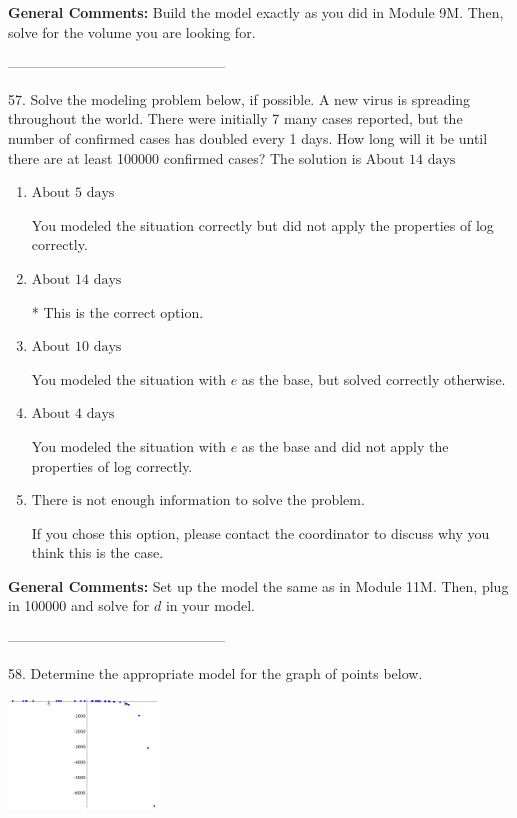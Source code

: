 \documentclass{extbook}[14pt]
\begin{document}
\textbf{General Comments:} Build the model exactly as you did in Module 9M. Then, solve for the volume you are looking for.

-----------------------------------------------

57. Solve the modeling problem below, if possible.
A new virus is spreading throughout the world. There were initially 7 many cases reported, but the number of confirmed cases has doubled every 1 days. How long will it be until there are at least 100000 confirmed cases? 
The solution is $ \text{About } 14 \text{ days} $ 

\begin{enumerate}[label=\Alph*.] 
\item $ \text{About } 5 \text{ days} $ 

 You modeled the situation correctly but did not apply the properties of log correctly. 
\item $ \text{About } 14 \text{ days} $ 

 * This is the correct option. 
\item $ \text{About } 10 \text{ days} $ 

 You modeled the situation with $e$ as the base, but solved correctly otherwise. 
\item $ \text{About } 4 \text{ days} $ 

 You modeled the situation with $e$ as the base and did not apply the properties of log correctly. 
\item $ \text{There is not enough information to solve the problem.} $ 

 If you chose this option, please contact the coordinator to discuss why you think this is the case. 
\end{enumerate} 
 
\textbf{General Comments:} Set up the model the same as in Module 11M. Then, plug in 100000 and solve for $d$ in your model.

-----------------------------------------------

58. Determine the appropriate model for the graph of points below.
\begin{center} \includegraphics[width=0.3\textwidth]{../Figures/identifyModelGraph12B.png} \end{center} 
\end{document}
